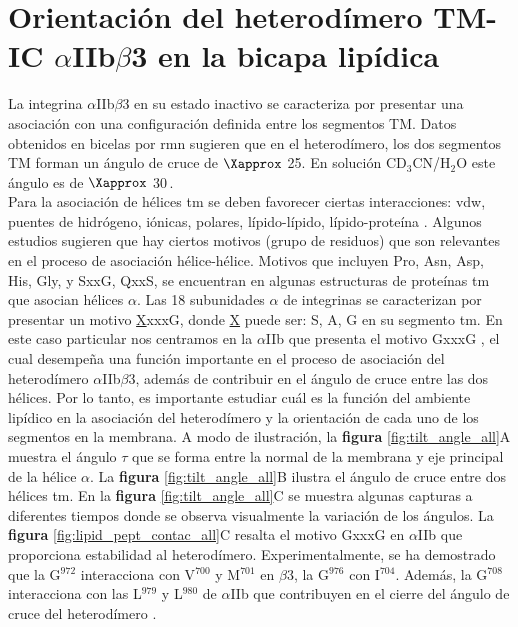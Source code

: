 \section{Orientación del heterodímero TM-IC $\alpha$IIb$\beta$3 en la bicapa lipídica}

La integrina $\alpha$IIb$\beta$3 en su estado inactivo se caracteriza por presentar una asociación con una configuración definida entre los segmentos TM. Datos obtenidos en bicelas por \ac{rmn} \citep{Lau2009} sugieren que en el heterodímero, los dos segmentos TM forman un ángulo de cruce de $\Xapprox$ 25\textdegree. En solución CD$_{3}$CN/H$_{2}$O este ángulo es de $\Xapprox$ 30\textdegree \,\citep{Yang2009}.\\
Para la asociación de hélices \ac{tm} se deben favorecer ciertas interacciones: \ac{vdw}, puentes de hidrógeno, iónicas, polares, lípido-lípido, lípido-proteína \citep{Fleming2001, Moore2008}. Algunos estudios sugieren que hay ciertos motivos (grupo de residuos) que son relevantes en el proceso de asociación hélice-hélice. Motivos que incluyen Pro, Asn, Asp, His, Gly, y SxxG, QxxS, se encuentran en algunas estructuras de proteínas  \ac{tm} que asocian hélices $\alpha$. Las 18 subunidades $\alpha$ de integrinas se caracterizan por presentar un motivo  \underline{X}xxxG, donde \underline{X} puede ser: S, A, G en su segmento \ac{tm}.
En este caso particular nos centramos en la $\alpha$IIb que presenta el motivo GxxxG \citep{Litvinov2019}, el cual desempeña una función importante en el proceso de asociación del heterodímero $\alpha$IIb$\beta$3, además de contribuir en el ángulo de cruce entre las dos hélices. Por lo tanto, es importante estudiar cuál es la función del ambiente lipídico en la asociación del heterodímero y la orientación de cada uno de los segmentos en la membrana. A modo de ilustración, la \textbf{figura} \ref{fig:tilt_angle_all}A muestra el ángulo $\tau$ que se forma entre la normal de la membrana y eje principal de la hélice $\alpha$. La  \textbf{figura} \ref{fig:tilt_angle_all}B ilustra el ángulo de cruce entre dos hélices \ac{tm}. En la \textbf{figura} \ref{fig:tilt_angle_all}C se muestra algunas capturas a diferentes tiempos donde se observa visualmente la variación de los ángulos. La \textbf{figura} \ref{fig:lipid_pept_contac_all}C resalta el motivo GxxxG en $\alpha$IIb que proporciona estabilidad al heterodímero. Experimentalmente, se ha demostrado que la G$^{972}$ interacciona con V$^{700}$ y M$^{701}$ en $\beta$3, la G$^{976}$ con I$^{704}$. Además, la G$^{708}$ interacciona con las L$^{979}$ y L$^{980}$ de $\alpha$IIb que contribuyen en el cierre del ángulo de cruce del heterodímero \citep{Lau2009, Yang2009}.

